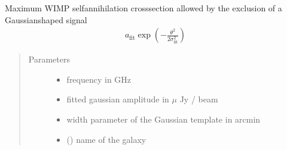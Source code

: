\documentclass[letterpaper,10pt,english]{sphinxmanual}
\begin{document}

\begin{fulllineitems}
\label{\detokenize{diffsph:diffsph.limits.sigmav_gausslim}}
\sphinxAtStartPar
Maximum WIMP self\sphinxhyphen{}annihilation cross\sphinxhyphen{}section allowed by the exclusion of a Gaussian\sphinxhyphen{}shaped signal
\begin{equation*}
\begin{split}a_\text{fit}\exp\left(-\frac{\theta^2}{2\sigma_\text{fit}^2}\right)\end{split}
\end{equation*}\begin{quote}\begin{description}
\item[{Parameters}] \leavevmode\begin{itemize}
\item {} 
\sphinxAtStartPar
{} \textendash{} frequency in GHz

\item {} 
\sphinxAtStartPar
{} \textendash{} fitted gaussian amplitude in \(\mu\) Jy / beam

\item {} 
\sphinxAtStartPar
{} \textendash{} width parameter of the Gaussian template in arcmin

\item {} 
\sphinxAtStartPar
{} () \textendash{} name of the galaxy


\end{itemize}
\end{description}
\end{quote}
\end{fulllineitems}
\end{document}
